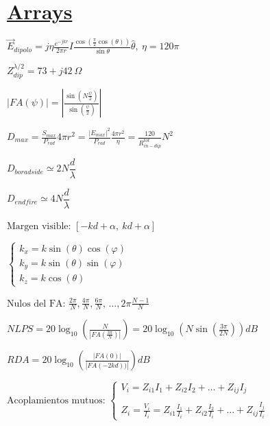 \documentclass[twocolumn, 8pt]{extarticle}
\begin{document}
\section*{\underline{Arrays}}
\( \vec{E}_{dipolo} = j \eta \frac{ e^{-jkr} }{ 2 \pi r } I \frac{ \cos\left(\frac{\pi}{2} \cos(\theta)\right) }{\sin{\theta}} \hat{\theta} ,\ \eta = 120\pi \)

\vspace{0.5cm}
\( Z_{dip}^{\lambda / 2} = 73 + j42 \  \Omega \)

\vspace{0.5cm}
\( \left|FA(\psi)\right| = \left|\frac{ \sin(N \frac{\psi}{2}) }{ \sin(\frac{\psi}{2}) } \right|\)

\vspace{0.5cm}
\( D_{max} = \frac{ S_{max} }{ P_{rad}} 4\pi r^2  = \frac{ \left|E_{max}\right|^2 }{ P_{rad}} \frac{4\pi r^2}{\eta} = \frac{120}{R^{tot}_{in-dip}}N^2 \)

\vspace{0.5cm}
\( D_{boradside} \simeq  2N \dfrac{d}{\lambda}\)

\vspace{0.5cm}
\( D_{endfire} \simeq  4N \dfrac{d}{\lambda}\)

\vspace{0.5cm}
\( \text{Margen visible: } [-kd + \alpha,\ kd + \alpha] \)

\vspace{0.5cm}
\(\left \{
\begin{array}{l}
	k_x = k \sin(\theta) \cos(\varphi) \\
	k_y = k \sin(\theta) \sin(\varphi) \\
	k_z = k \cos(\theta)
\end{array}
\right .
\)

\vspace{0.5cm}
\( \text{Nulos del FA: } \frac{ 2\pi }{ N }, \frac{ 4\pi }{ N }, \frac{ 6\pi }{ N }, \, \dots  ,2\pi \frac{N - 1}{N} \)

\vspace{0.5cm}
\( NLPS = 20 \log_{10} \left(\frac{ N }{\left|FA\left(\frac{ 3\pi }{ N }\right)\right|} \right) = 20 \log_{10} \left(N \sin\left( \frac{ 3\pi }{ 2N }\right)\right) dB \)

\vspace{0.5cm}
\( RDA = 20 \log_{10} \left( \frac{ \left|FA(0)\right| }{ \left|FA(-2kd))\right| } \right) dB \)

\vspace{0.5cm}
\( \text{Acoplamientos mutuos: } \left \{
\begin{array}{l}
	V_i = Z_{i1}I_1 + Z_{i2}I_2 + \dots + Z_{ij}I_j \\ \\
	Z_i = \frac{V_i}{I_i} = Z_{i1} \frac{I_1}{I_i} + Z_{i2} \frac{I_2}{I_i} + \dots + Z_{ij} \frac{I_j}{I_i}
\end{array}
\right .
\)
\end{document}
